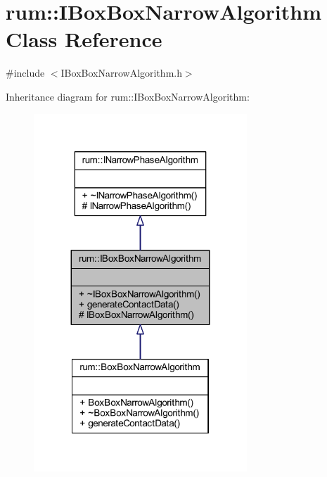 \hypertarget{classrum_1_1_i_box_box_narrow_algorithm}{}\section{rum\+:\+:I\+Box\+Box\+Narrow\+Algorithm Class Reference}
\label{classrum_1_1_i_box_box_narrow_algorithm}


{\ttfamily \#include $<$I\+Box\+Box\+Narrow\+Algorithm.\+h$>$}



Inheritance diagram for rum\+:\+:I\+Box\+Box\+Narrow\+Algorithm\+:\nopagebreak
\begin{figure}[H]
\begin{center}
\leavevmode
\includegraphics[width=227pt]{classrum_1_1_i_box_box_narrow_algorithm__inherit__graph}
\end{center}
\end{figure}


